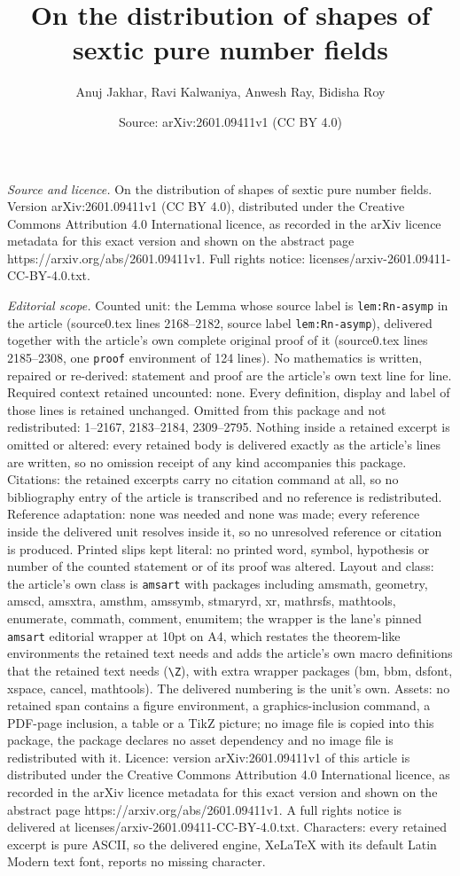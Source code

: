 \documentclass[10pt,a4paper]{amsart}
\title[On the distribution of shapes of sextic pure number fields]{On the distribution of shapes of sextic pure number fields}
\author{Anuj Jakhar, Ravi Kalwaniya, Anwesh Ray, Bidisha Roy}
\date{Source: arXiv:2601.09411v1 (CC BY 4.0)}
\begin{document}
\maketitle

\noindent\emph{Source and licence.} On the distribution of shapes of sextic pure number fields. Version arXiv:2601.09411v1 (CC BY 4.0), distributed under the Creative Commons Attribution 4.0 International licence, as recorded in the arXiv licence metadata for this exact version and shown on the abstract page https://arxiv.org/abs/2601.09411v1. Full rights notice: licenses/arxiv-2601.09411-CC-BY-4.0.txt.\par\smallskip

\noindent\textit{Editorial scope.} Counted unit: the Lemma whose source label is \texttt{lem:Rn-asymp} in the article (source0.tex lines 2168--2182, source label \texttt{lem:Rn-asymp}), delivered together with the article's own complete original proof of it (source0.tex lines 2185--2308, one \texttt{proof} environment of 124 lines). No mathematics is written, repaired or re-derived: statement and proof are the article's own text line for line. Required context retained uncounted: none. Every definition, display and label of those lines is retained unchanged. Omitted from this package and not redistributed: 1--2167, 2183--2184, 2309--2795. Nothing inside a retained excerpt is omitted or altered: every retained body is delivered exactly as the article's lines are written, so no omission receipt of any kind accompanies this package. Citations: the retained excerpts carry no citation command at all, so no bibliography entry of the article is transcribed and no reference is redistributed. Reference adaptation: none was needed and none was made; every reference inside the delivered unit resolves inside it, so no unresolved reference or citation is produced. Printed slips kept literal: no printed word, symbol, hypothesis or number of the counted statement or of its proof was altered. Layout and class: the article's own class is \texttt{amsart} with packages including amsmath, geometry, amscd, amsxtra, amsthm, amssymb, stmaryrd, xr, mathrsfs, mathtools, enumerate, commath, comment, enumitem; the wrapper is the lane's pinned \texttt{amsart} editorial wrapper at 10pt on A4, which restates the theorem-like environments the retained text needs and adds the article's own macro definitions that the retained text needs (\texttt{\textbackslash Z}), with extra wrapper packages (bm, bbm, dsfont, xspace, cancel, mathtools). The delivered numbering is the unit's own. Assets: no retained span contains a figure environment, a graphics-inclusion command, a PDF-page inclusion, a table or a TikZ picture; no image file is copied into this package, the package declares no asset dependency and no image file is redistributed with it. Licence: version arXiv:2601.09411v1 of this article is distributed under the Creative Commons Attribution 4.0 International licence, as recorded in the arXiv licence metadata for this exact version and shown on the abstract page https://arxiv.org/abs/2601.09411v1. A full rights notice is delivered at licenses/arxiv-2601.09411-CC-BY-4.0.txt. Characters: every retained excerpt is pure ASCII, so the delivered engine, XeLaTeX with its default Latin Modern text font, reports no missing character.
\end{document}
